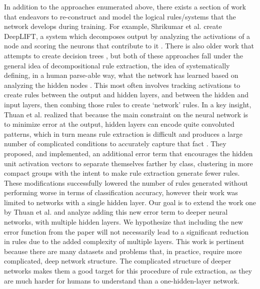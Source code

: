 In addition to the approaches enumerated above, there exists a section of work that endeavors to re-construct and model the logical rules/systems that the network develops during training. For example, Shrikumar et al. create DeepLIFT, a system which decomposes output by analyzing the activations of a node and scoring the neurons that contribute to it \cite{shrikumar2017learning}. There is also older work that attempts to create decision trees \cite{ baehrens2010explain}, but both of these approaches fall under the general idea of decompositional rule extraction, the idea of systematically defining, in a human parse-able way, what the network has learned based on analyzing the hidden nodes \cite{duch2001new} \cite{tsukimoto2000extracting}. This most often involves tracking activations to create rules between the output and hidden layers, and between the hidden and input layers, then combing those rules to create ‘network’ rules. In a key insight, Thuan et al. realized that because the main constraint on the neural network is to minimize error at the output, hidden layers can encode quite convoluted patterns, which in turn means rule extraction is difficult and produces a large number of complicated conditions to accurately capture that fact \cite{thuan11}. They proposed, and implemented, an additional error term that encourages the hidden unit activation vectors to separate themselves farther by class, clustering in more compact groups with the intent to make rule extraction generate fewer rules. These modifications successfully lowered the number of rules generated without performing worse in terms of classification accuracy, however their work was limited to networks with a single hidden layer. 
Our goal is to extend the work one by Thuan et al. and analyze adding this new error term to deeper neural networks, with multiple hidden layers. We hypothesize that including the new error function from the paper will not necessarily lead to a significant reduction in rules due to the added complexity of multiple layers. This work is pertinent because there are many datasets and problems that, in practice, require more complicated, deep network structure. The complicated structure of deeper networks makes them a good target for this procedure of rule extraction, as they are much harder for humans to understand than a one-hidden-layer network.

